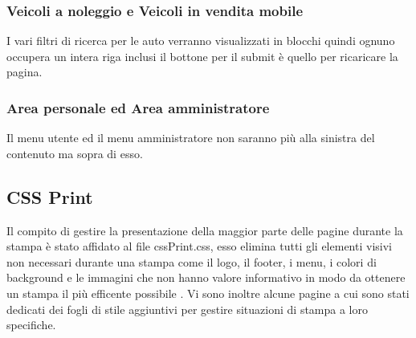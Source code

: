         \subsubsection{Veicoli a noleggio e Veicoli in vendita mobile}
        I vari filtri di ricerca per le auto verranno visualizzati in blocchi quindi ognuno occupera un intera riga inclusi il bottone per il submit è quello per ricaricare la pagina.

        \subsubsection{Area personale ed Area amministratore}
        Il menu utente ed il menu amministratore non saranno più alla sinistra del contenuto ma sopra di esso.
    
    \subsection{CSS Print}
        Il compito di gestire la presentazione della maggior parte delle pagine durante la stampa è stato affidato al file cssPrint.css, esso elimina tutti gli elementi visivi non necessari durante una stampa come il logo, il footer, i menu, i colori di background e le immagini che non hanno valore informativo in modo da ottenere un stampa il più efficente possibile .
        Vi sono inoltre alcune pagine a cui sono stati dedicati dei fogli di stile aggiuntivi per gestire situazioni di stampa a loro specifiche.



\pagebreak